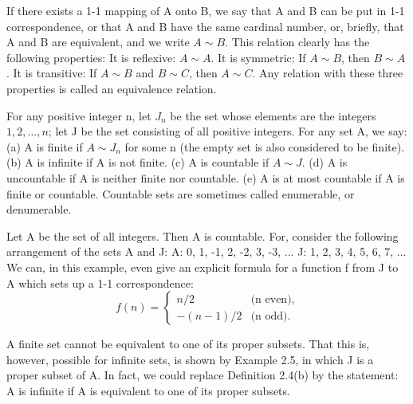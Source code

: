\begin{definition} %
  \label{def:chap2:equivalence}
  If there exists a 1-1 mapping of A onto B, we say that A and B can
  be put in 1-1 correspondence, or that A and B have the same
  cardinal number, or, briefly, that A and B are equivalent, and we
  write $A \sim B$. This relation clearly has the following properties:
  It is reflexive: $A \sim A$.
  It is symmetric: If $A \sim B$, then $B \sim A$.
  It is transitive: If $A \sim B$ and $B \sim C$, then $A \sim C$.
  Any relation with these three properties is called an equivalence relation.
\end{definition}

\begin{definition} %
  \label{def:chap2:countability_types}
  For any positive integer n, let $J_n$ be the set whose elements are
  the integers $1, 2, \dots, n$; let J be the set consisting of all
  positive integers. For any set A, we say:
  (a) A is finite if $A \sim J_n$ for some n (the empty set is also
  considered to be finite).
  (b) A is infinite if A is not finite.
  (c) A is countable if $A \sim J$.
  (d) A is uncountable if A is neither finite nor countable.
  (e) A is at most countable if A is finite or countable.
  Countable sets are sometimes called enumerable, or denumerable.
\end{definition}

\begin{example} %
  \label{ex:chap2:integers_countable}
  Let A be the set of all integers. Then A is countable. For,
  consider the following arrangement of the sets A and J:
  A: 0, 1, -1, 2, -2, 3, -3, ...
  J: 1, 2,  3, 4,  5, 6,  7, ...
  We can, in this example, even give an explicit formula for a
  function f from J to A which sets up a 1-1 correspondence:
  \[ f(n) =
    \begin{cases} n/2 & \text{(n even)}, \\ -(n-1)/2 & \text{(n odd)}.
  \end{cases} \]
\end{example}

\begin{remark} %
  \label{rem:chap2:infinite_subsets}
  A finite set cannot be equivalent to one of its proper subsets.
  That this is, however, possible for infinite sets, is shown by
  Example 2.5, in which J is a proper subset of A.
  In fact, we could replace Definition 2.4(b) by the statement: A is
  infinite if A is equivalent to one of its proper subsets.
\end{remark}

